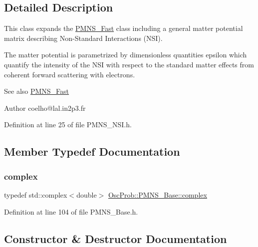 \subsection{Detailed Description}
This class expands the \hyperlink{classOscProb_1_1PMNS__Fast}{P\+M\+N\+S\+\_\+\+Fast} class including a general matter potential matrix describing Non-\/\+Standard Interactions (N\+SI).

The matter potential is parametrized by dimensionless quantities epsilon which quantify the intensity of the N\+SI with respect to the standard matter effects from coherent forward scattering with electrons.

\begin{DoxySeeAlso}{See also}
\hyperlink{classOscProb_1_1PMNS__Fast}{P\+M\+N\+S\+\_\+\+Fast}
\end{DoxySeeAlso}
\begin{DoxyAuthor}{Author}
coelho@lal.\+in2p3.\+fr 
\end{DoxyAuthor}


Definition at line 25 of file P\+M\+N\+S\+\_\+\+N\+S\+I.\+h.



\subsection{Member Typedef Documentation}
\mbox{\label{classOscProb_1_1PMNS__Base_ae86ec4718808ce9d02e5f5b4226714ab}} 
\subsubsection{\texorpdfstring{complex}{complex}}
{\footnotesize\ttfamily typedef std\+::complex$<$double$>$ \hyperlink{classOscProb_1_1PMNS__Base_ae86ec4718808ce9d02e5f5b4226714ab}{Osc\+Prob\+::\+P\+M\+N\+S\+\_\+\+Base\+::complex}\hspace{0.3cm}{\ttfamily [inherited]}}



Definition at line 104 of file P\+M\+N\+S\+\_\+\+Base.\+h.



\subsection{Constructor \& Destructor Documentation}
\mbox{\label{classOscProb_1_1PMNS__NSI_ab41e79fb427c7a5662443acad31ce7e9}} 
